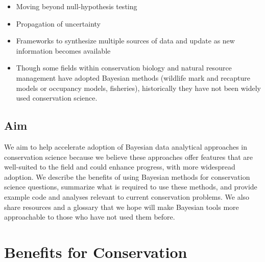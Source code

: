 \documentclass{article}
\begin{document}
\begin{itemize}

\item Moving beyond null-hypothesis testing 
\item Propagation of uncertainty
\item Frameworks to synthesize multiple sources of data and update as new information becomes available
\item Though some fields within conservation biology and natural resource management have adopted Bayesian methods (wildlife mark and recapture models or occupancy models, fisheries), historically they have not been widely used conservation science.

\end{itemize}

\subsection*{Aim} We aim to help accelerate adoption of Bayesian data analytical approaches in conservation science because we believe these approaches offer features that are well-suited to the field and could enhance progress, with more  widespread adoption. We describe the benefits of using Bayesian methods for conservation science questions, summarize what is required to use these methods, and provide example code and analyses relevant to current conservation problems. We also share resources and a glossary that we hope will make Bayesian tools more approachable to those who have not used them before.

\section* {Benefits for Conservation}
\end{document}
